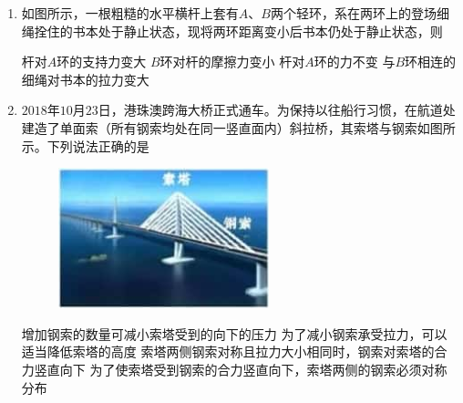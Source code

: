 
\begin{enumerate}
\renewcommand{\labelenumi}{\arabic{enumi}.}
\item
{}
如图所示，一根粗糙的水平横杆上套有$ A $、$ B $两个轻环，系在两环上的登场细绳拴住的书本处于静止状态，现将两环距离变小后书本仍处于静止状态，则  



\begin{minipage}[h!]{0.7\linewidth}
\vspace{0.3em}
\fourchoices
{杆对$ A $环的支持力变大}
{$ B $环对杆的摩擦力变小}
{杆对$ A $环的力不变}
{与$ B $环相连的细绳对书本的拉力变大}

\vspace{0.3em}
\end{minipage}
\hfill
\begin{minipage}[h!]{0.3\linewidth}
\flushright
\vspace{0.3em}

\vspace{0.3em}
\end{minipage}



\item 
{}
$ 2018 $年$ 10 $月$ 23 $日，港珠澳跨海大桥正式通车。为保持以往船行习惯，在航道处建造了单面索（所有钢索均处在同一竖直面内）斜拉桥，其索塔与钢索如图所示。下列说法正确的是  
\begin{figure}[h!]
\centering
\includegraphics[width=0.23\linewidth]{picture/Picture1.png}
\end{figure}



\fourchoices
{增加钢索的数量可减小索塔受到的向下的压力}
{为了减小钢索承受拉力，可以适当降低索塔的高度}
{索塔两侧钢索对称且拉力大小相同时，钢索对索塔的合力竖直向下}
{为了使索塔受到钢索的合力竖直向下，索塔两侧的钢索必须对称分布}





\end{enumerate}
